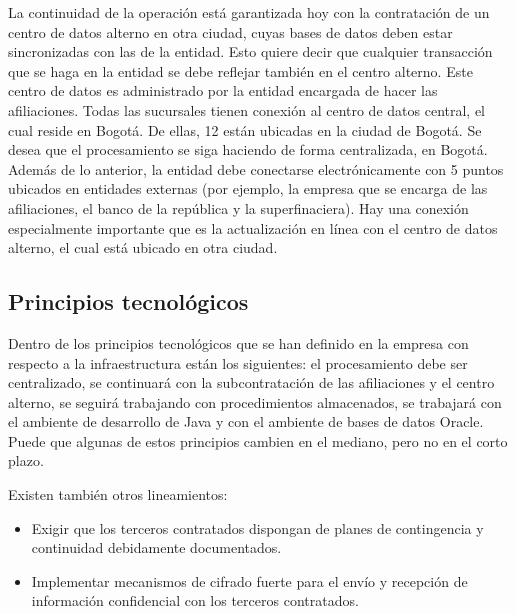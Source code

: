 \documentclass[a4paper]{article}
\begin{document}
La continuidad de la operación está garantizada hoy con la contratación de un centro de datos alterno en otra
ciudad, cuyas bases de datos deben estar sincronizadas con las de la entidad. Esto quiere decir que cualquier
transacción que se haga en la entidad se debe reflejar también en el centro alterno. Este centro de datos es
administrado por la entidad encargada de hacer las afiliaciones.
Todas las sucursales tienen conexión al centro de datos central, el cual reside en Bogotá. De ellas, 12 están ubicadas
en la ciudad de Bogotá. Se desea que el procesamiento se siga haciendo de forma centralizada, en Bogotá.
Además de lo anterior, la entidad debe conectarse electrónicamente con 5 puntos ubicados en entidades externas
(por ejemplo, la empresa que se encarga de las afiliaciones, el banco de la república y la superfinaciera). Hay una
conexión especialmente importante que es la actualización en línea con el centro de datos alterno, el cual está
ubicado en otra ciudad.

\subsection{Principios tecnológicos}

Dentro de los principios tecnológicos que se han definido en la empresa con respecto a la infraestructura están los
siguientes: el procesamiento debe ser centralizado, se continuará con la subcontratación de las afiliaciones y el
centro alterno, se seguirá trabajando con procedimientos almacenados, se trabajará con el ambiente de desarrollo
de Java y con el ambiente de bases de datos Oracle. Puede que algunas de estos principios cambien en el mediano,
pero no en el corto plazo.

Existen también otros lineamientos:
\begin{itemize}
    \item Exigir que los terceros contratados dispongan de planes de contingencia y continuidad debidamente
    documentados.
    \item Implementar mecanismos de cifrado fuerte para el envío y recepción de información confidencial con los
    terceros contratados.
\end{itemize}
\end{document}
